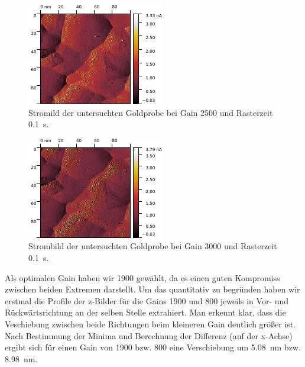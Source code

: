 \begin{figure}[H]
\centering
\includegraphics[width=\textwidth]{../Gwyddion/Gold/GAIN_extra_I_forward.pdf}
\caption{Stromild der untersuchten Goldprobe bei Gain 2500 und Rasterzeit \SI{0.1}{s}.}
\label{GAIN_extra_I}
\end{figure}

\begin{figure}[H]
\centering
\includegraphics[width=\textwidth]{../Gwyddion/Gold/GAIN_fast_I_forward.pdf}
\caption{Strombild der untersuchten Goldprobe bei Gain 3000 und Rasterzeit \SI{0.1}{s}.}
\label{GAIN_fast_I}
\end{figure}

Als optimalen Gain haben wir 1900 gewählt, da es einen guten Kompromiss zwischen beiden Extremen darstellt. Um das quantitativ zu begründen haben wir erstmal die Profile der z-Bilder für die Gains 1900 und 800 jeweils in Vor- und Rückwärtsrichtung an der selben Stelle extrahiert. Man erkennt klar, dass die Veschiebung zwischen beide Richtungen beim kleineren Gain deutlich größer ist. Nach Bestimmung der Minima und Berechnung der Differenz (auf der x-Achse) ergibt sich für einen Gain von 1900 bzw. 800 eine Verschiebung um \SI{5,08}{nm} bzw. \SI{8,98}{nm}.

